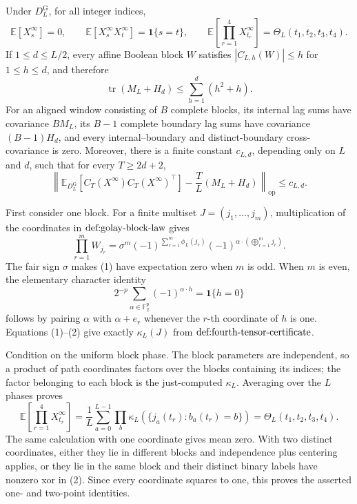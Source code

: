 Under \(D_L^{\mathrm G}\), for all integer indices,
\[
\mathbb E[X_s^{\infty}]=0,\qquad
\mathbb E[X_s^{\infty}X_t^{\infty}]=\mathbf 1\{s=t\},\qquad
\mathbb E\!\left[\prod_{r=1}^4X_{t_r}^{\infty}\right]
=\Theta_L(t_1,t_2,t_3,t_4).
\]
If \(1\le d\le L/2\), every affine Boolean block \(W\) satisfies \(|C_{L,h}(W)|\le h\) for \(1\le h\le d\), and therefore
\[
\operatorname{tr}(M_L+H_d)\le \sum_{h=1}^d(h^2+h).
\]
For an aligned window consisting of \(B\) complete blocks, its internal lag sums have covariance \(BM_L\), its \(B-1\) complete boundary lag sums have covariance \((B-1)H_d\), and every internal--boundary and distinct-boundary cross-covariance is zero.  Moreover, there is a finite constant \(c_{L,d}\), depending only on \(L\) and \(d\), such that for every \(T\ge 2d+2\),
\[
\left\|\mathbb E_{D_L^{\mathrm G}}\!\left[C_T(X^{\infty})C_T(X^{\infty})^{\top}\right]
-\frac{T}{L}(M_L+H_d)\right\|_{\mathrm{op}}\le c_{L,d}.
\]

First consider one block.  For a finite multiset \(J=(j_1,\ldots,j_m)\), multiplication of the coordinates in \(\textnormal{def:golay-block-law}\) gives
\[
\prod_{r=1}^mW_{j_r}
=\sigma^m(-1)^{\sum_{r=1}^m\phi_L(j_r)}
 (-1)^{\alpha\cdot(\bigoplus_{r=1}^m j_r)}. \tag{1}
\]
The fair sign \(\sigma\) makes (1) have expectation zero when \(m\) is odd.  When \(m\) is even, the elementary character identity
\[
2^{-p}\sum_{\alpha\in\mathbb F_2^p}(-1)^{\alpha\cdot h}=\mathbf 1\{h=0\} \tag{2}
\]
follows by pairing \(\alpha\) with \(\alpha+e_r\) whenever the \(r\)-th coordinate of \(h\) is one.  Equations (1)--(2) give exactly \(\kappa_L(J)\) from \(\textnormal{def:fourth-tensor-certificate}\).

Condition on the uniform block phase.  The block parameters are independent, so a product of path coordinates factors over the blocks containing its indices; the factor belonging to each block is the just-computed \(\kappa_L\).  Averaging over the \(L\) phases proves
\[
\mathbb E\!\left[\prod_{r=1}^4X_{t_r}^{\infty}\right]
=\frac1L\sum_{a=0}^{L-1}\prod_b
 \kappa_L\!\left(\{j_a(t_r):b_a(t_r)=b\}\right)
=\Theta_L(t_1,t_2,t_3,t_4). \tag{3}
\]
The same calculation with one coordinate gives mean zero.  With two distinct coordinates, either they lie in different blocks and independence plus centering applies, or they lie in the same block and their distinct binary labels have nonzero xor in (2).  Since every coordinate squares to one, this proves the asserted one- and two-point identities.

